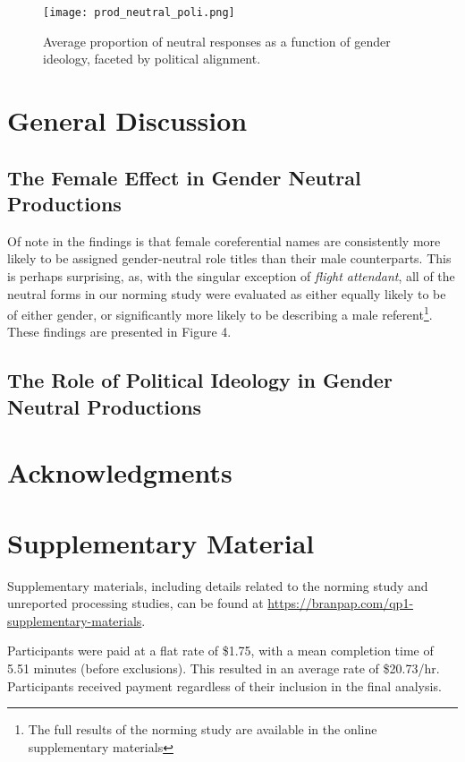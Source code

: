 \begin{figure*}[ht!]
	\centering
	\texttt{[image: prod\_neutral\_poli.png]}
	\caption{Average proportion of neutral responses as a function of gender ideology, faceted by political alignment.}
	\label{prod-neutral-poli}
\end{figure*}
\section{General Discussion}

\subsection{The Female Effect in Gender Neutral Productions}
Of note in the findings is that female coreferential names are consistently more likely to be assigned gender-neutral role titles than their male counterparts. This is perhaps surprising, as, with the singular exception of \textit{flight attendant}, all of the neutral forms in our norming study were evaluated as either equally likely to be of either gender, or significantly more likely to be describing a male referent\footnote{The full results of the norming study are available in the online supplementary materials}. These findings are presented in Figure 4.

\subsection{The Role of Political Ideology in Gender Neutral Productions}

\section{Acknowledgments}

\section{Supplementary Material}
Supplementary materials, including details related to the norming study and unreported processing studies, can be found at \url{https://branpap.com/qp1-supplementary-materials}.

\nocite{labov1963social}



	Participants were paid at a flat rate of \$1.75, with a mean completion time of 5.51 minutes (before exclusions). This resulted in an average rate of \$20.73/hr. Participants received payment regardless of their inclusion in the final analysis.
	
